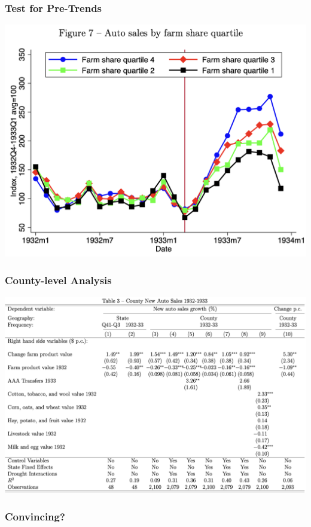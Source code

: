 \documentclass[english,xcolor=svgnames]{beamer}
\begin{document}
\begin{frame}
\frametitle[alignment=center]{Test for Pre-Trends}
\centering
\includegraphics[scale=0.5]{figures/HRWFIG7.png}
\end{frame}

\begin{frame}
\frametitle[alignment=center]{County-level Analysis}
\centering
\includegraphics[scale=0.4]{figures/HRWTAB3.png}
\end{frame}

\begin{frame}
\frametitle[alignment=center]{Convincing?}

\end{frame}
\end{document}
